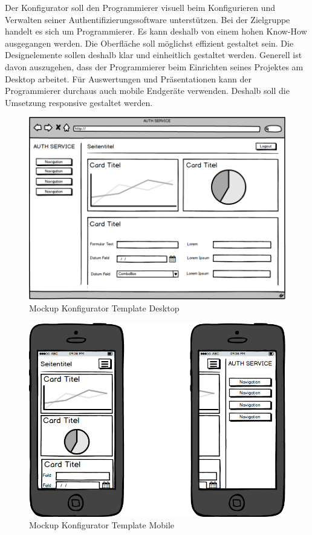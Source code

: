 Der Konfigurator soll den Programmierer visuell beim Konfigurieren und
Verwalten seiner Authentifizierungssoftware unterstützen. Bei der
Zielgruppe handelt es sich um Programmierer. Es kann deshalb von einem
hohen Know-How ausgegangen werden. Die Oberfläche soll möglichst
effizient gestaltet sein. Die Designelemente sollen deshalb klar und
einheitlich gestaltet werden. Generell ist davon auszugehen, dass der
Programmierer beim Einrichten seines Projektes am Desktop arbeitet. Für
Auswertungen und Präsentationen kann der Programmierer durchaus auch
mobile Endgeräte verwenden. Deshalb soll die Umsetzung responsive
gestaltet werden.

\begin{figure}[htbp]
\centering
\includegraphics{images/mockups/General.png}
\caption{Mockup Konfigurator Template Desktop}
\end{figure}

\newpage

\begin{figure}[htbp]
\centering
\includegraphics{images/mockups/Mobile.png}
\caption{Mockup Konfigurator Template Mobile}
\end{figure}

